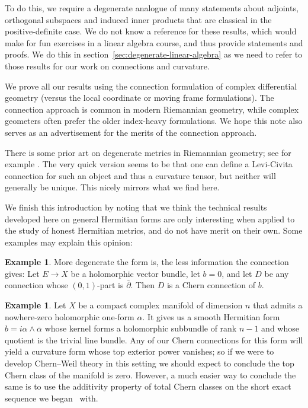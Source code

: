 \documentclass[10pt,a4paper]{amsart}
\theoremstyle{definition}
\newtheorem{exam}[theo]{Example}
\def\ov#1{\overline{#1}}
\begin{document}
To do this, we require a degenerate analogue of many statements about adjoints,
orthogonal subspaces and induced inner products that are classical in the
positive-definite case. We do not know a reference for these results, which
would make for fun exercises in a linear algebra course, and thus provide
statements and proofs. We do this in
section~\ref{sec:degenerate-linear-algebra} as we need to refer to those
results for our work on connections and curvature.

We prove all our results using the connection formulation of complex
differential geometry (versus the local coordinate or moving frame
formulations). The connection approach is common in modern Riemannian geometry,
while complex geometers often prefer the older index-heavy formulations. We hope
this note also serves as an advertisement for the merits of the connection
approach.

There is some prior art on degenerate metrics in Riemannian geometry; see for example \cite{bel1975degenerate,stoica2011cartan,stoica2014singular}.
The very quick version seems to be that one can define a Levi-Civita connection for such an object and thus a curvature tensor, but neither will generally be unique.
This nicely mirrors what we find here.


We finish this introduction by noting that we think the technical results developed here on general Hermitian forms are only interesting when applied to the study of honest Hermitian metrics, and do not have merit on their own.
Some examples may explain this opinion:


\begin{exam}
More degenerate the form is, the less information the connection gives:
Let $E \to X$ be a holomorphic vector bundle, let $b = 0$, and let $D$ be any connection whose $(0,1)$-part is $\bar\partial$. Then $D$ is a Chern connection of $b$.
\end{exam}


\begin{exam}
Let $X$ be a compact complex manifold of dimension $n$
that admits a nowhere-zero holomorphic one-form $\alpha$.
It  gives us a smooth Hermitian form $b = i \alpha \wedge \ov \alpha$ whose kernel forms a holomorphic subbundle of rank $n-1$ and whose quotient is the trivial line bundle.
Any of our Chern connections for this form will yield a curvature form whose
top exterior power vanishes; so if we were to develop Chern--Weil theory in
this setting we should expect to conclude the top Chern class of the manifold
is zero. However, a much easier way to conclude the same is to use the
additivity property of total Chern classes on the short exact sequence we began
~with.%
\end{exam}
\end{document}

